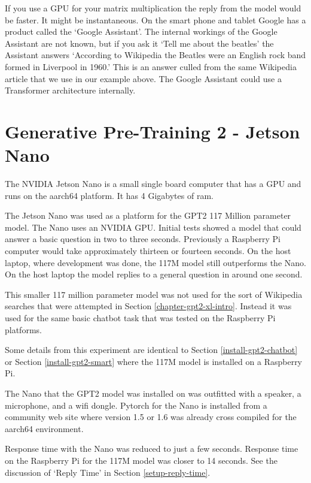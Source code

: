 If you use a GPU for your matrix multiplication the reply from the model would be faster. It might be instantaneous. On the smart phone and tablet Google has a product called the `Google Assistant'. The internal workings of the Google Assistant are not known, but if you ask it `Tell me about the beatles' the Assistant answers `According to Wikipedia the Beatles were an English rock band formed in Liverpool in 1960.' This is an answer culled from the same Wikipedia article that we use in our example above. The Google Assistant could use a Transformer architecture internally.

\label{chapter-xlarge}

\section{Generative Pre-Training 2 - Jetson Nano}

\label{chapter-nano}
The NVIDIA Jetson Nano is a small single board computer that has a GPU and runs on the aarch64 platform. It has 4 Gigabytes of ram.

The Jetson Nano was used as a platform for the GPT2 117 Million parameter model. The Nano uses an NVIDIA GPU. Initial tests showed a model that could answer a basic question in two to three seconds. Previously a Raspberry Pi computer would take approximately thirteen or fourteen seconds. On the host laptop, where development was done, the 117M model still outperforms the Nano. On the host laptop the model replies to a general question in around one second.

This smaller 117 million parameter model was not used for the sort of Wikipedia searches that were attempted in Section \ref{chapter-gpt2-xl-intro}. Instead it was used for the same basic chatbot task that was tested on the Raspberry Pi platforms.

Some details from this experiment are identical to Section \ref{install-gpt2-chatbot} or Section \ref{install-gpt2-smart} where the 117M model is installed on a Raspberry Pi.

The Nano that the GPT2 model was installed on was outfitted with a speaker, a microphone, and a wifi dongle. Pytorch for the Nano is installed from a community web site where version 1.5 or 1.6 was already cross compiled for the aarch64 environment. 

Response time with the Nano was reduced to just a few seconds. Response time on the Raspberry Pi for the 117M model was closer to 14 seconds. See the discussion of `Reply Time' in Section \ref{setup-reply-time}.

